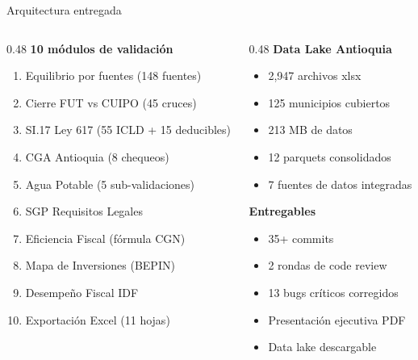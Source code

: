\documentclass[aspectratio=169,11pt]{beamer}
\begin{document}
\begin{frame}{Arquitectura entregada}
\footnotesize
\begin{columns}[T]
\begin{column}{0.48\textwidth}
\textbf{10 m\'odulos de validaci\'on}
\begin{enumerate}\setlength{\itemsep}{0pt}
    \item Equilibrio por fuentes (148 fuentes)
    \item Cierre FUT vs CUIPO (45 cruces)
    \item SI.17 Ley 617 (55 ICLD + 15 deducibles)
    \item CGA Antioquia (8 chequeos)
    \item Agua Potable (5 sub-validaciones)
    \item SGP Requisitos Legales
    \item Eficiencia Fiscal (f\'ormula CGN)
    \item Mapa de Inversiones (BEPIN)
    \item Desempe\~no Fiscal IDF
    \item Exportaci\'on Excel (11 hojas)
\end{enumerate}
\end{column}
\begin{column}{0.48\textwidth}
\textbf{Data Lake Antioquia}
\begin{itemize}\setlength{\itemsep}{0pt}
    \item 2,947 archivos xlsx
    \item 125 municipios cubiertos
    \item 213 MB de datos
    \item 12 parquets consolidados
    \item 7 fuentes de datos integradas
\end{itemize}

\vspace{6pt}
\textbf{Entregables}
\begin{itemize}\setlength{\itemsep}{0pt}
    \item 35+ commits
    \item 2 rondas de code review
    \item 13 bugs cr\'iticos corregidos
    \item Presentaci\'on ejecutiva PDF
    \item Data lake descargable
\end{itemize}
\end{column}
\end{columns}
\end{frame}
\end{document}
